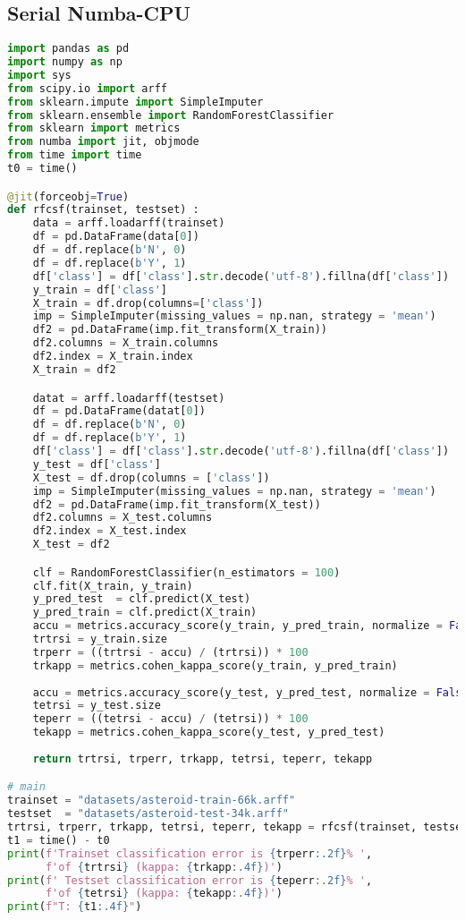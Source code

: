\subsection{Serial Numba-CPU}
\begin{lstlisting}[language=Python, caption={Serial Numba-CPU implementation of the RF test case.}]
import pandas as pd
import numpy as np
import sys
from scipy.io import arff
from sklearn.impute import SimpleImputer
from sklearn.ensemble import RandomForestClassifier
from sklearn import metrics    
from numba import jit, objmode
from time import time
t0 = time()

@jit(forceobj=True)
def rfcsf(trainset, testset) :
    data = arff.loadarff(trainset)
    df = pd.DataFrame(data[0])
    df = df.replace(b'N', 0)
    df = df.replace(b'Y', 1)
    df['class'] = df['class'].str.decode('utf-8').fillna(df['class'])
    y_train = df['class']
    X_train = df.drop(columns=['class'])
    imp = SimpleImputer(missing_values = np.nan, strategy = 'mean')
    df2 = pd.DataFrame(imp.fit_transform(X_train))
    df2.columns = X_train.columns
    df2.index = X_train.index
    X_train = df2

    datat = arff.loadarff(testset)
    df = pd.DataFrame(datat[0])
    df = df.replace(b'N', 0)
    df = df.replace(b'Y', 1)
    df['class'] = df['class'].str.decode('utf-8').fillna(df['class'])
    y_test = df['class']
    X_test = df.drop(columns = ['class'])
    imp = SimpleImputer(missing_values = np.nan, strategy = 'mean')
    df2 = pd.DataFrame(imp.fit_transform(X_test))
    df2.columns = X_test.columns
    df2.index = X_test.index
    X_test = df2

    clf = RandomForestClassifier(n_estimators = 100)
    clf.fit(X_train, y_train)
    y_pred_test  = clf.predict(X_test)
    y_pred_train = clf.predict(X_train)
    accu = metrics.accuracy_score(y_train, y_pred_train, normalize = False)
    trtrsi = y_train.size
    trperr = ((trtrsi - accu) / (trtrsi)) * 100
    trkapp = metrics.cohen_kappa_score(y_train, y_pred_train)
    
    accu = metrics.accuracy_score(y_test, y_pred_test, normalize = False)
    tetrsi = y_test.size
    teperr = ((tetrsi - accu) / (tetrsi)) * 100
    tekapp = metrics.cohen_kappa_score(y_test, y_pred_test)
    
    return trtrsi, trperr, trkapp, tetrsi, teperr, tekapp

# main
trainset = "datasets/asteroid-train-66k.arff"
testset  = "datasets/asteroid-test-34k.arff"
trtrsi, trperr, trkapp, tetrsi, teperr, tekapp = rfcsf(trainset, testset)
t1 = time() - t0
print(f'Trainset classification error is {trperr:.2f}% ',
      f'of {trtrsi} (kappa: {trkapp:.4f})')
print(f' Testset classification error is {teperr:.2f}% ',
      f'of {tetrsi} (kappa: {tekapp:.4f})')
print(f"T: {t1:.4f}")
\end{lstlisting}





